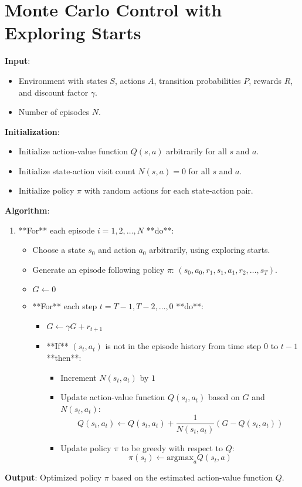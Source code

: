 \documentclass{article}
\begin{document}
\section*{Monte Carlo Control with Exploring Starts}

\textbf{Input}:
\begin{itemize}
    \item Environment with states \( S \), actions \( A \), transition probabilities \( P \), rewards \( R \), and discount factor \( \gamma \).
    \item Number of episodes \( N \).
\end{itemize}

\textbf{Initialization}:
\begin{itemize}
    \item Initialize action-value function \( Q(s, a) \) arbitrarily for all \( s \) and \( a \).
    \item Initialize state-action visit count \( N(s, a) = 0 \) for all \( s \) and \( a \).
    \item Initialize policy \( \pi \) with random actions for each state-action pair.
\end{itemize}

\textbf{Algorithm}:
\begin{enumerate}
    \item **For** each episode \( i = 1, 2, \ldots, N \) **do**:
        \begin{itemize}
            \item Choose a state \( s_0 \) and action \( a_0 \) arbitrarily, using exploring starts.
            \item Generate an episode following policy \( \pi \): \( (s_0, a_0, r_1, s_1, a_1, r_2, \ldots, s_T) \).
            \item \( G \leftarrow 0 \)
            \item **For** each step \( t = T-1, T-2, \ldots, 0 \) **do**:
                \begin{itemize}
                    \item \( G \leftarrow \gamma G + r_{t+1} \)
                    \item **If** \( (s_t, a_t) \) is not in the episode history from time step \( 0 \) to \( t-1 \) **then**:
                        \begin{itemize}
                            \item Increment \( N(s_t, a_t) \) by \( 1 \)
                            \item Update action-value function \( Q(s_t, a_t) \) based on \( G \) and \( N(s_t, a_t) \):
                                \[ Q(s_t, a_t) \leftarrow Q(s_t, a_t) + \frac{1}{N(s_t, a_t)} (G - Q(s_t, a_t)) \]
                            \item Update policy \( \pi \) to be greedy with respect to \( Q \):
                                \[ \pi(s_t) \leftarrow \text{argmax}_a Q(s_t, a) \]
                        \end{itemize}
                \end{itemize}
        \end{itemize}
\end{enumerate}

\textbf{Output}: Optimized policy \( \pi \) based on the estimated action-value function \( Q \).
\end{document}
